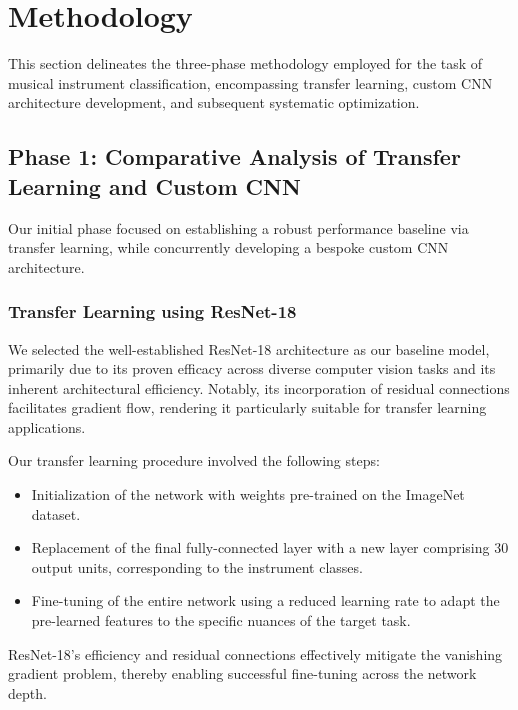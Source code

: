 
\section{Methodology}
This section delineates the three-phase methodology employed for the task of musical instrument classification, encompassing transfer learning, custom CNN architecture development, and subsequent systematic optimization.

\subsection{Phase 1: Comparative Analysis of Transfer Learning and Custom CNN}
Our initial phase focused on establishing a robust performance baseline via transfer learning, while concurrently developing a bespoke custom CNN architecture.

\subsubsection{Transfer Learning using ResNet-18}
We selected the well-established ResNet-18 architecture \cite{he2016deep} as our baseline model, primarily due to its proven efficacy across diverse computer vision tasks and its inherent architectural efficiency. Notably, its incorporation of residual connections facilitates gradient flow, rendering it particularly suitable for transfer learning applications.

Our transfer learning procedure involved the following steps:
\begin{itemize}
    \item Initialization of the network with weights pre-trained on the ImageNet dataset.
    \item Replacement of the final fully-connected layer with a new layer comprising 30 output units, corresponding to the instrument classes.
    \item Fine-tuning of the entire network using a reduced learning rate to adapt the pre-learned features to the specific nuances of the target task.
\end{itemize}
ResNet-18's efficiency and residual connections effectively mitigate the vanishing gradient problem, thereby enabling successful fine-tuning across the network depth.


